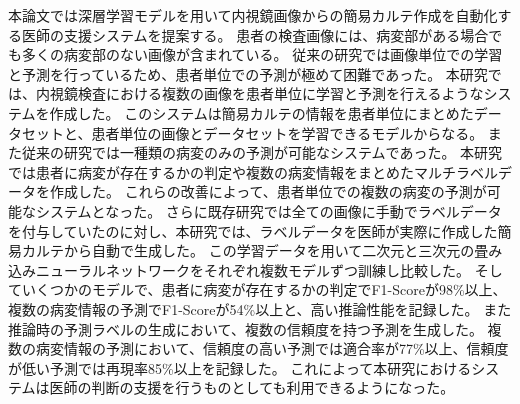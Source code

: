 本論文では深層学習モデルを用いて内視鏡画像からの簡易カルテ作成を自動化する医師の支援システムを提案する。
患者の検査画像には、病変部がある場合でも多くの病変部のない画像が含まれている。
従来の研究では画像単位での学習と予測を行っているため、患者単位での予測が極めて困難であった。
本研究では、内視鏡検査における複数の画像を患者単位に学習と予測を行えるようなシステムを作成した。
このシステムは簡易カルテの情報を患者単位にまとめたデータセットと、患者単位の画像とデータセットを学習できるモデルからなる。
また従来の研究では一種類の病変のみの予測が可能なシステムであった。
本研究では患者に病変が存在するかの判定や複数の病変情報をまとめたマルチラベルデータを作成した。
これらの改善によって、患者単位での複数の病変の予測が可能なシステムとなった。
さらに既存研究では全ての画像に手動でラベルデータを付与していたのに対し、本研究では、ラベルデータを医師が実際に作成した簡易カルテから自動で生成した。
この学習データを用いて二次元と三次元の畳み込みニューラルネットワークをそれぞれ複数モデルずつ訓練し比較した。
そしていくつかのモデルで、患者に病変が存在するかの判定でF1-Scoreが98\%以上、複数の病変情報の予測でF1-Scoreが54\%以上と、高い推論性能を記録した。
また推論時の予測ラベルの生成において、複数の信頼度を持つ予測を生成した。
複数の病変情報の予測において、信頼度の高い予測では適合率が77\%以上、信頼度が低い予測では再現率85\%以上を記録した。
これによって本研究におけるシステムは医師の判断の支援を行うものとしても利用できるようになった。
